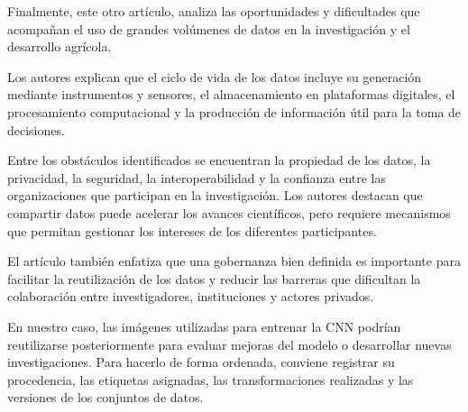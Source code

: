 Finalmente, este otro artículo, analiza las oportunidades y dificultades que acompañan el uso de grandes volúmenes de datos en la investigación y el desarrollo agrícola.

Los autores explican que el ciclo de vida de los datos incluye su generación mediante instrumentos y sensores, el almacenamiento en plataformas digitales, el procesamiento computacional y la producción de información útil para la toma de decisiones.

Entre los obstáculos identificados se encuentran la propiedad de los datos, la privacidad, la seguridad, la interoperabilidad y la confianza entre las organizaciones que participan en la investigación. Los autores destacan que compartir datos puede acelerar los avances científicos, pero requiere mecanismos que permitan gestionar los intereses de los diferentes participantes.

El artículo también enfatiza que una gobernanza bien definida es importante para facilitar la reutilización de los datos y reducir las barreras que dificultan la colaboración entre investigadores, instituciones y actores privados.

En nuestro caso, las imágenes utilizadas para entrenar la CNN podrían reutilizarse posteriormente para evaluar mejoras del modelo o desarrollar nuevas investigaciones. Para hacerlo de forma ordenada, conviene registrar su procedencia, las etiquetas asignadas, las transformaciones realizadas y las versiones de los conjuntos de datos.

\nocite{iso27001,barton2025,kaur2022,wilgenbusch2022}
